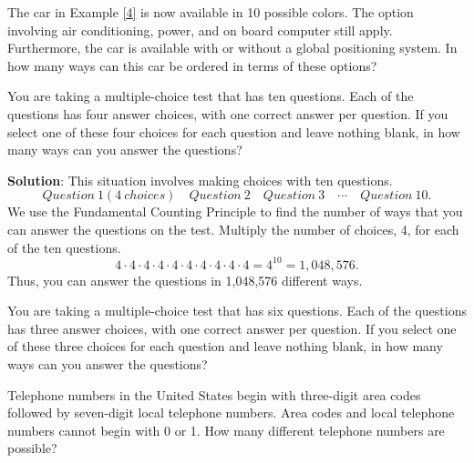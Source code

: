\begin{ex} 
The car in Example \ref{4} is now available in 10 possible colors. The option involving air conditioning, power, and on board computer still apply. Furthermore, the car is available with or without a global positioning system. In how many ways can this car be ordered in terms of these options?
\end{ex}
\vfill
\pagebreak

\begin{exe}
You are taking a multiple-choice test that has ten questions. Each of the questions has four answer choices, with one correct answer per question. If you select one of these four choices for each question and leave nothing blank, in how many ways can you answer the questions?
\end{exe}

{\bf Solution}: 
This situation involves making choices with ten questions.
\[ Question\ 1 (4 \ choices) \quad Question\ 2 \quad Question\ 3 \quad \cdots \quad  Question \ 10.\]
We use the Fundamental Counting Principle to find the number of ways that you can answer the questions on the test. Multiply the number of choices, 4, for each of the ten questions.
\[4 \cdot 4 \cdot 4 \cdot 4 \cdot 4 \cdot 4 \cdot 4 \cdot 4 \cdot 4 \cdot 4 =4^{10}=1,048,576.\]
Thus, you can answer the questions in 1,048,576 different ways.

\begin{ex}
You are taking a multiple-choice test that has six questions. Each of the questions has three answer choices, with one correct answer per question. If you select one of these three choices for each question and leave nothing blank, in how many ways can you answer the questions?
\end{ex}
\vfill


\begin{ex}  
Telephone numbers in the United States begin with three-digit area codes followed by seven-digit local telephone numbers. Area codes and local telephone numbers cannot begin with 0 or 1. How many different telephone numbers are possible?
\end{ex}
\vfill
\pagebreak

